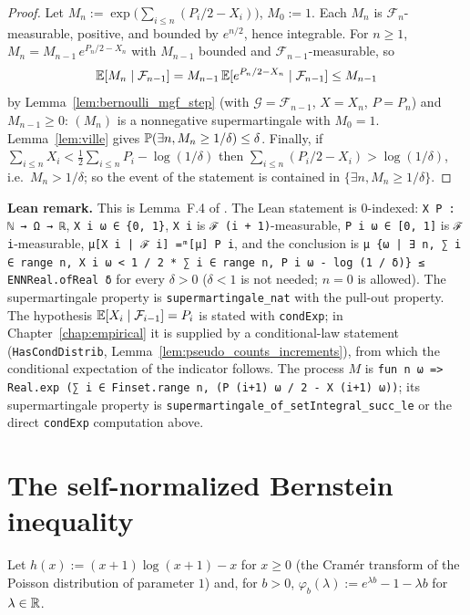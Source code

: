 \begin{proof}
\leanok
Let $M_n := \exp\big(\sum_{i \le n} (P_i/2 - X_i)\big)$, $M_0 := 1$. Each $M_n$ is
$\mathcal F_n$-measurable, positive, and bounded by $e^{n/2}$, hence integrable. For $n \ge 1$,
$M_n = M_{n-1}\, e^{P_n/2 - X_n}$ with $M_{n-1}$ bounded and $\mathcal F_{n-1}$-measurable, so
\[
  \mathbb{E}[M_n \mid \mathcal F_{n-1}] = M_{n-1}\, \mathbb{E}[e^{P_n/2 - X_n} \mid \mathcal F_{n-1}] \le M_{n-1}
\]
by Lemma~\ref{lem:bernoulli_mgf_step} (with $\mathcal G = \mathcal F_{n-1}$, $X = X_n$,
$P = P_n$) and $M_{n-1} \ge 0$: $(M_n)$ is a nonnegative supermartingale with $M_0 = 1$.
Lemma~\ref{lem:ville} gives $\mathbb{P}(\exists n, M_n \ge 1/\delta) \le \delta$. Finally, if
$\sum_{i \le n} X_i < \frac12 \sum_{i \le n} P_i - \log(1/\delta)$ then
$\sum_{i \le n}(P_i/2 - X_i) > \log(1/\delta)$, i.e.\ $M_n > 1/\delta$; so the event of the
statement is contained in $\{\exists n, M_n \ge 1/\delta\}$.
\end{proof}

\textbf{Lean remark.} This is Lemma~F.4 of \cite{dann2017unifying}. The Lean statement is
$0$-indexed: \texttt{X P : ℕ → Ω → ℝ}, \texttt{X i ω ∈ \{0, 1\}}, \texttt{X i} is
\texttt{ℱ (i + 1)}-measurable, \texttt{P i ω ∈ [0, 1]} is \texttt{ℱ i}-measurable,
\texttt{μ[X i | ℱ i] =ᵐ[μ] P i}, and the conclusion is
\texttt{μ \{ω | ∃ n, ∑ i ∈ range n, X i ω < 1 / 2 * ∑ i ∈ range n, P i ω - log (1 / δ)\} ≤ ENNReal.ofReal δ}
for every $\delta > 0$ ($\delta < 1$ is not needed; $n = 0$ is allowed). The supermartingale
property is \texttt{supermartingale\_nat} with the pull-out property. The hypothesis
$\mathbb{E}[X_i \mid \mathcal F_{i-1}] = P_i$ is stated with \texttt{condExp}; in
Chapter~\ref{chap:empirical} it is supplied by a conditional-law statement
(\texttt{HasCondDistrib}, Lemma~\ref{lem:pseudo_counts_increments}), from which the
conditional expectation of the indicator follows. The process $M$ is
\texttt{fun n ω => Real.exp (∑ i ∈ Finset.range n, (P (i+1) ω / 2 - X (i+1) ω))}; its
supermartingale property is \texttt{supermartingale\_of\_setIntegral\_succ\_le} or the
direct \texttt{condExp} computation above.

\section{The self-normalized Bernstein inequality}
\label{sec:pconc_bernstein}

Let $h(x) := (x + 1)\log(x + 1) - x$ for $x \ge 0$ (the Cramér transform of the Poisson
distribution of parameter $1$) and, for $b > 0$, $\varphi_b(\lambda) := e^{\lambda b} - 1 - \lambda b$
for $\lambda \in \mathbb{R}$.

